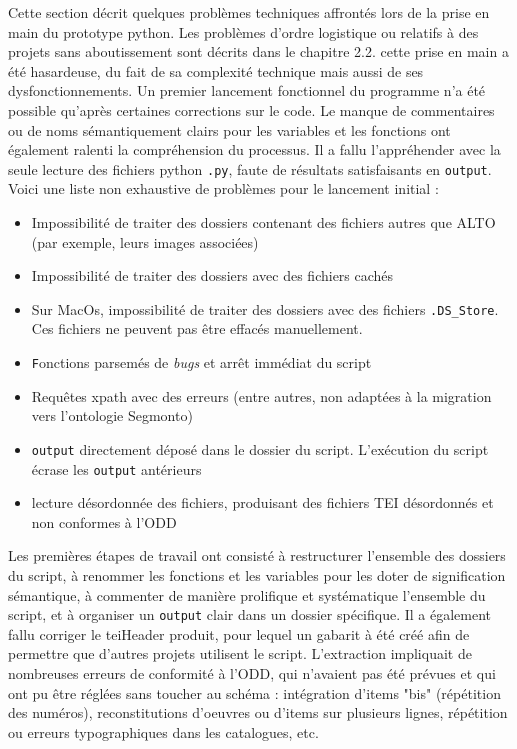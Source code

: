 \documentclass[a4paper,12pt,twoside]{book}
\begin{document}
Cette section décrit quelques problèmes techniques affrontés lors de la prise en main du prototype python. Les problèmes d'ordre logistique ou relatifs à des projets sans aboutissement sont décrits dans le chapitre 2.2. cette prise en main a été hasardeuse, du fait de sa complexité technique mais aussi de ses dysfonctionnements. Un premier lancement fonctionnel du programme n'a été possible qu'après certaines corrections sur le code. Le manque de commentaires ou de noms sémantiquement clairs pour les variables et les fonctions ont également ralenti la compréhension du processus. Il a fallu l'appréhender avec la seule lecture des fichiers python \texttt{.py}, faute de résultats satisfaisants en \texttt{output}. Voici une liste non exhaustive de problèmes pour le lancement initial :
\begin{itemize}
	\item Impossibilité de traiter des dossiers contenant des fichiers autres que ALTO (par exemple, leurs images associées)
	\item Impossibilité de traiter des dossiers avec des fichiers cachés
	\item Sur MacOs, impossibilité de traiter des dossiers avec des fichiers \texttt{.DS\_Store}. Ces fichiers ne peuvent pas être effacés manuellement.
	\item \texttt Fonctions parsemés de \textit{bugs} et arrêt immédiat du script
	\item Requêtes xpath avec des erreurs (entre autres, non adaptées à la migration vers l'ontologie Segmonto)
	\item \texttt{output} directement déposé dans le dossier du script. L'exécution du script écrase les \texttt{output} antérieurs
	\item  lecture désordonnée des fichiers, produisant des fichiers TEI désordonnés et non conformes à l'ODD
\end{itemize}

Les premières étapes de travail ont consisté à restructurer l'ensemble des dossiers du script, à renommer les fonctions et les variables pour les doter de signification sémantique, à commenter de manière prolifique et systématique l'ensemble du script, et à organiser un \texttt{output} clair dans un dossier spécifique. Il a également fallu corriger le teiHeader produit, pour lequel un gabarit à été créé afin de permettre que d'autres projets utilisent le script. L'extraction impliquait de nombreuses erreurs de conformité à l'ODD, qui n'avaient pas été prévues et qui ont pu être réglées sans toucher au schéma : intégration d'items "bis" (répétition des numéros), reconstitutions d'oeuvres ou d'items sur plusieurs lignes, répétition ou erreurs typographiques dans les catalogues, etc.
\end{document}

